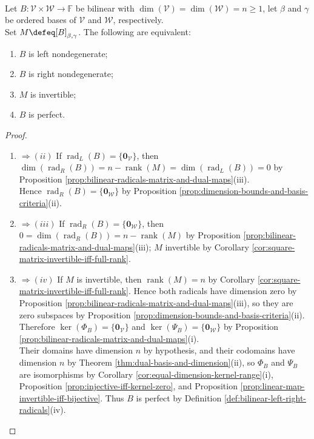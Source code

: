 \begin{proposition} \label{prop:square-bilinear-pairing-equivalences} \\
Let $B:\mathcal{V}\times\mathcal{W}\to\mathbb{F}$ be bilinear with $\dim(\mathcal{V})=\dim(\mathcal{W})=n\geq1$, let $\beta$ and $\gamma$ be ordered bases of $\mathcal{V}$ and $\mathcal{W}$, respectively.\\
Set $M\defeq[B]_{\beta,\gamma}$. The following are equivalent:
\begin{enumerate}[label=(\roman*)]
\setlength{\itemsep}{0pt}
\item $B$ is left nondegenerate;
\item $B$ is right nondegenerate;
\item $M$ is invertible;
\item $B$ is perfect.
\end{enumerate}
\begin{proof}
\begin{enumerate}[label=(\roman*)]
\setlength{\itemsep}{0pt}
\item[$(i)$] $\Rightarrow (ii)$ If $\operatorname{rad}_{L}(B)=\{\mathbf{0}_{\mathcal{V}}\}$, then $\dim(\operatorname{rad}_{R}(B))=n-\operatorname{rank}(M)=\dim(\operatorname{rad}_{L}(B))=0$ by Proposition \ref{prop:bilinear-radicals-matrix-and-dual-maps}(iii).\\
Hence $\operatorname{rad}_{R}(B)=\{\mathbf{0}_{\mathcal{W}}\}$ by Proposition \ref{prop:dimension-bounds-and-basis-criteria}(ii).
\item[$(ii)$] $\Rightarrow (iii)$ If $\operatorname{rad}_{R}(B)=\{\mathbf{0}_{\mathcal{W}}\}$, then $0=\dim(\operatorname{rad}_{R}(B))=n-\operatorname{rank}(M)$ by Proposition \ref{prop:bilinear-radicals-matrix-and-dual-maps}(iii); $M$ invertible by Corollary \ref{cor:square-matrix-invertible-iff-full-rank}.
\item[$(iii)$] $\Rightarrow (iv)$ If $M$ is invertible, then $\operatorname{rank}(M)=n$ by Corollary \ref{cor:square-matrix-invertible-iff-full-rank}. Hence both radicals have dimension zero by Proposition \ref{prop:bilinear-radicals-matrix-and-dual-maps}(iii), so they are zero subspaces by Proposition \ref{prop:dimension-bounds-and-basis-criteria}(ii). Therefore $\ker(\Phi_B)=\{\mathbf{0}_{\mathcal{V}}\}$ and $\ker(\Psi_B)=\{\mathbf{0}_{\mathcal{W}}\}$ by Proposition \ref{prop:bilinear-radicals-matrix-and-dual-maps}(i).\\
Their domains have dimension $n$ by hypothesis, and their codomains have dimension $n$ by Theorem \ref{thm:dual-basis-and-dimension}(ii), so $\Phi_B$ and $\Psi_B$ are isomorphisms by Corollary \ref{cor:equal-dimension-kernel-range}(i), Proposition \ref{prop:injective-iff-kernel-zero}, and Proposition \ref{prop:linear-map-invertible-iff-bijective}. Thus $B$ is perfect by Definition \ref{def:bilinear-left-right-radicals}(iv).

\end{enumerate}
\end{proof}
\end{proposition}
